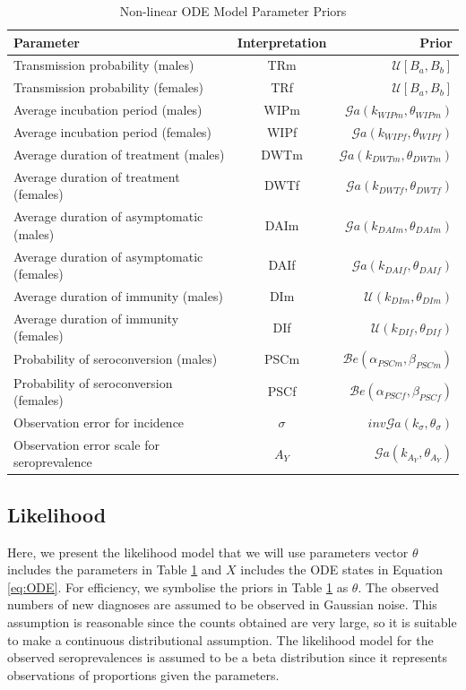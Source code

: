 \documentclass[12pt]{article}
\begin{document}
\begin{table}[h!]
\centering
 \begin{tabular}{||l c r||} 
 \hline
 Parameter & Interpretation & Prior \\ [0.5ex] 
 \hline\hline
 Transmission probability (males) & TRm & $\mathcal{U}[B_a, B_b]$ \\ 
 Transmission probability (females) & TRf & $\mathcal{U}[B_a, B_b]$  \\
 Average incubation period (males) & WIPm & $\mathcal{G}a(k_{WIPm}, \theta_{WIPm})$  \\
 Average incubation period (females) & WIPf & $\mathcal{G}a(k_{WIPf}, \theta_{WIPf})$  \\
 Average duration of treatment (males)  & DWTm & $\mathcal{G}a(k_{DWTm}, \theta_{DWTm})$  \\
 Average duration of treatment (females) & DWTf & $\mathcal{G}a(k_{DWTf}, \theta_{DWTf})$  \\
 Average duration of asymptomatic (males) & DAIm & $\mathcal{G}a(k_{DAIm}, \theta_{DAIm})$  \\
 Average duration of asymptomatic (females) & DAIf & $\mathcal{G}a(k_{DAIf}, \theta_{DAIf})$ \\
 Average duration of immunity (males) & DIm & $\mathcal{U}(k_{DIm}, \theta_{DIm})$ \\
 Average duration of immunity (females) & DIf & $\mathcal{U}(k_{DIf}, \theta_{DIf})$  \\
 Probability of seroconversion (males) & PSCm & $\mathcal{B}e(\alpha_{PSCm}, \beta_{PSCm})$ \\
 Probability of seroconversion (females) & PSCf & $\mathcal{B}e(\alpha_{PSCf}, \beta_{PSCf})$ \\
 Observation error for incidence & $\sigma$ & $inv\mathcal{G}a(k_{\sigma}, \theta_{\sigma})$ \\
 Observation error scale for seroprevalence & $A_{Y}$ & $\mathcal{G}a(k_{A_{Y}}, \theta_{A_{Y}})$  \\ [1ex] 
 \hline
 \end{tabular}
 \caption{Non-linear ODE Model Parameter Priors}
\label{table:priors}
\end{table} 

\subsection{Likelihood}

Here, we present the likelihood model that we will use parameters vector $\theta$ includes the parameters in Table \ref{table:priors} and $X$ includes the ODE states in Equation \ref{eq:ODE}. For efficiency, we symbolise the priors in Table \ref{table:priors} as $\theta$. The observed numbers of new diagnoses are assumed to be observed in Gaussian noise. This assumption is reasonable since the counts obtained are very large, so it is suitable to make a continuous distributional assumption. The likelihood model for the observed seroprevalences is assumed to be a beta distribution since it represents observations of proportions given the parameters. 
\end{document}
